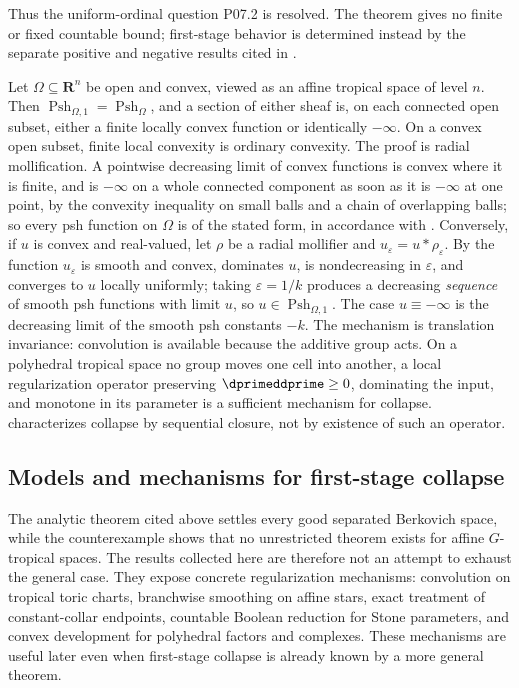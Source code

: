 Thus the uniform-ordinal question P07.2 is resolved.  The theorem gives no
finite or fixed countable bound; first-stage behavior is determined instead
by the separate positive and negative results cited in
.

\begin{remark}
\label{rem:ch16-collapse-euclidean}
Let $\Omega\subseteq\mathbf R^n$ be open and convex, viewed as an affine
tropical space of level $n$.  Then
$\operatorname{Psh}_{\Omega,1}=\operatorname{Psh}_\Omega$, and a section of
either sheaf is, on each connected open subset, either a finite locally
convex function or identically $-\infty$.  On a convex open subset, finite
local convexity is ordinary convexity.  The proof is radial mollification.  A
pointwise decreasing limit of convex functions is convex where it is finite,
and is $-\infty$ on a whole connected component as soon as it is $-\infty$
at one point, by the convexity inequality on small balls and a chain of
overlapping balls; so every psh
function on $\Omega$ is of the stated form, in accordance with
.  Conversely, if $u$ is convex and
real-valued, let $\rho$ be a radial mollifier and
$u_\varepsilon=u*\rho_\varepsilon$.  By
 the function $u_\varepsilon$ is smooth
and convex, dominates $u$, is nondecreasing in $\varepsilon$, and converges
to $u$ locally uniformly; taking $\varepsilon=1/k$ produces a decreasing
\emph{sequence} of smooth psh functions with limit $u$, so
$u\in\operatorname{Psh}_{\Omega,1}$.  The case $u\equiv-\infty$ is the
decreasing limit of the smooth psh constants $-k$.  The mechanism is
translation invariance: convolution is available because the additive group
acts.  On a polyhedral tropical space no group moves one cell into another,
a local regularization operator preserving $\dprimeddprime\geq0$,
dominating the input, and monotone in its parameter is a sufficient
mechanism for collapse.   characterizes
collapse by sequential closure, not by existence of such an operator.
\end{remark}

\subsection{Models and mechanisms for first-stage collapse}
\label{sec:ch16-collapse-positive-cases}

The analytic theorem cited above settles every good separated Berkovich
space, while the counterexample shows that no unrestricted theorem exists
for affine $G$-tropical spaces.  The results collected here are therefore
not an attempt to exhaust the general case.  They expose concrete
regularization mechanisms: convolution on tropical toric charts,
branchwise smoothing on affine stars, exact treatment of constant-collar
endpoints, countable Boolean reduction for Stone parameters, and convex
development for polyhedral factors and complexes.  These mechanisms are
useful later even when first-stage collapse is already known by a more
general theorem.

